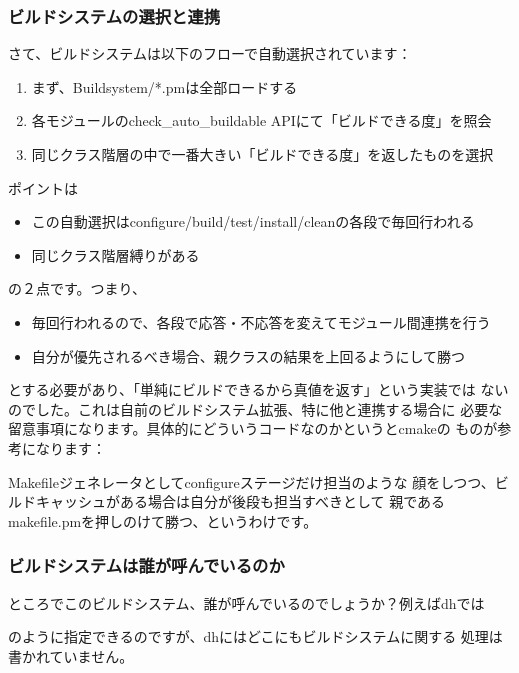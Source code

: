 \documentclass[mingoth,a4paper]{jsarticle}
\begin{document}
\subsubsection{ビルドシステムの選択と連携}
さて、ビルドシステムは以下のフローで自動選択されています：
\begin{enumerate}
\item まず、Buildsystem/*.pmは全部ロードする
\item 各モジュールのcheck\_auto\_buildable APIにて「ビルドできる度」を照会
\item 同じクラス階層の中で一番大きい「ビルドできる度」を返したものを選択
\end{enumerate}
ポイントは
\begin{itemize}
\item この自動選択はconfigure/build/test/install/cleanの各段で毎回行われる
\item 同じクラス階層縛りがある
\end{itemize}
の２点です。つまり、
\begin{itemize}
\item 毎回行われるので、各段で応答・不応答を変えてモジュール間連携を行う
\item 自分が優先されるべき場合、親クラスの結果を上回るようにして勝つ
\end{itemize}
とする必要があり、「単純にビルドできるから真値を返す」という実装では
ないのでした。これは自前のビルドシステム拡張、特に他と連携する場合に
必要な留意事項になります。具体的にどういうコードなのかというとcmakeの
ものが参考になります：
Makefileジェネレータとしてconfigureステージだけ担当のような
顔をしつつ、ビルドキャッシュがある場合は自分が後段も担当すべきとして
親であるmakefile.pmを押しのけて勝つ、というわけです。

\subsubsection{ビルドシステムは誰が呼んでいるのか}
ところでこのビルドシステム、誰が呼んでいるのでしょうか？例えばdhでは
のように指定できるのですが、dhにはどこにもビルドシステムに関する
処理は書かれていません。
\end{document}
